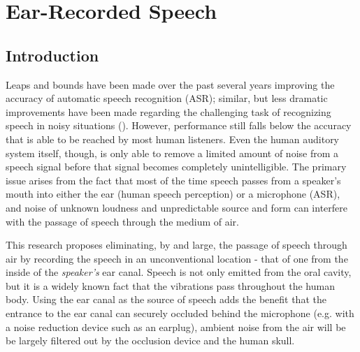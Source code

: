 \documentclass[dissertation,copyright]{uathesis}
\begin{document}




 





\chapter{Ear-Recorded Speech\label{chapter2}}


\section{Introduction}

Leaps and bounds have been made over the past several years improving the accuracy of automatic speech recognition (ASR); similar, but less dramatic improvements have been made regarding the challenging task of recognizing speech in noisy situations (\cite{zhang:17}).  However, performance still falls below the accuracy that is able to be reached by most human listeners.  Even the human auditory system itself, though, is only able to remove a limited amount of noise from a speech signal before that signal becomes completely unintelligible.  The primary issue arises from the fact that most of the time speech passes from a speaker's mouth into either the ear (human speech perception) or a microphone (ASR), and noise of unknown loudness and unpredictable source and form can interfere with the passage of speech through the medium of air.  

This research proposes eliminating, by and large, the passage of speech through air by recording the speech in an unconventional location - that of one from the inside of the \textit{speaker's} ear canal.  Speech is not only emitted from the oral cavity, but it is a widely known fact that the vibrations pass throughout the human body.  Using the ear canal as the source of speech adds the benefit that the entrance to the ear canal can securely occluded behind the microphone (e.g. with a noise reduction device such as an earplug), ambient noise from the air will be be largely filtered out by the occlusion device and the human skull.
\end{document}
